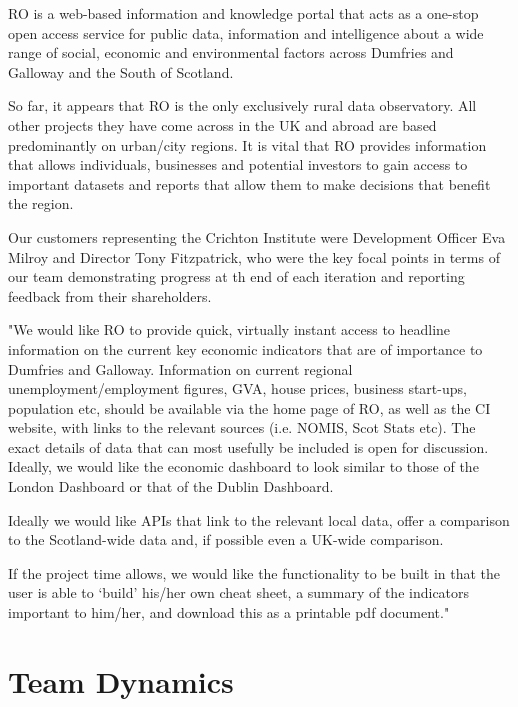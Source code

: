 \documentclass{l3proj}
\begin{document}
RO is a web-based information and knowledge portal that acts as a one-stop open access service for public data, information and
intelligence about a wide range of social, economic and environmental factors across Dumfries and Galloway and the South of Scotland.

So far, it appears that RO is the only exclusively rural data observatory. All other projects they have come across in the UK and abroad
are based predominantly on urban/city regions. It is vital that RO provides information that allows individuals, businesses and potential
investors to gain access to important datasets and reports that allow them to make decisions that benefit the region.

Our customers representing the Crichton Institute were Development Officer Eva Milroy and Director Tony Fitzpatrick, who were the key
focal points in terms of our team demonstrating progress at th end of each iteration and reporting feedback from their shareholders.


"We would like RO to provide quick, virtually instant access to headline information on the current key economic indicators that are of
importance to Dumfries and Galloway. Information on current regional unemployment/employment figures, GVA, house prices, business start-ups,
population etc, should be available via the home page of RO, as well as the CI website, with links to the relevant sources
(i.e. NOMIS, Scot Stats etc). The exact details of data that can most usefully be included is open for discussion. Ideally, we would like
the economic dashboard to look similar to those of the London Dashboard or that of the Dublin Dashboard.

Ideally we would like APIs that link to the relevant local data, offer a comparison to the Scotland-wide data and,
if possible even a UK-wide comparison.

If the project time allows, we would like the functionality to be built in that the user is able to ‘build’ his/her own cheat sheet,
a summary of the indicators important to him/her, and download this as a printable pdf document."


\section{Team Dynamics}
\end{document}
